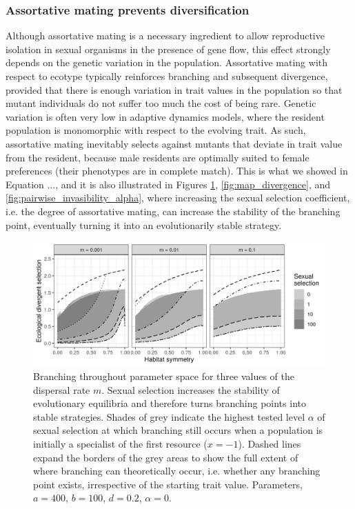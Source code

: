 \subsubsection*{Assortative mating prevents diversification}

Although assortative mating is a necessary ingredient to allow reproductive isolation in sexual organisms in the presence of gene flow, this effect strongly depends on the genetic variation in the population. Assortative mating with respect to ecotype typically reinforces branching and subsequent divergence, provided that there is enough variation in trait values in the population so that mutant individuals do not suffer too much the cost of being rare. Genetic variation is often very low in adaptive dynamics models, where the resident population is monomorphic with respect to the evolving trait. As such, assortative mating inevitably selects against mutants that deviate in trait value from the resident, because male residents are optimally suited to female preferences (their phenotypes are in complete match). This is what we showed in Equation ..., and it is also illustrated in Figures \ref{fig:map_branching_points}, \ref{fig:map_divergence}, and \ref{fig:pairwise_invasibility_alpha}, where increasing the sexual selection coefficient, i.e. the degree of assortative mating, can increase the stability of the branching point, eventually turning it into an evolutionarily stable strategy.

\begin{figure}
    \centering
    \includegraphics[width=\textwidth]{figures/map_branching_points}
    \caption{Branching throughout parameter space for three values of the dispersal rate $m$. Sexual selection increases the stability of evolutionary equilibria and therefore turns branching points into stable strategies. Shades of grey indicate the highest tested level $\alpha$ of sexual selection at which branching still occurs when a population is initially a specialist of the first resource ($x = -1$). Dashed lines expand the borders of the grey areas to show the full extent of where branching can theoretically occur, i.e. whether any branching point exists, irrespective of the starting trait value. Parameters, $a = 400$, $b = 100$, $d = 0.2$, $\alpha = 0$.}
    \label{fig:map_branching_points}
\end{figure}

